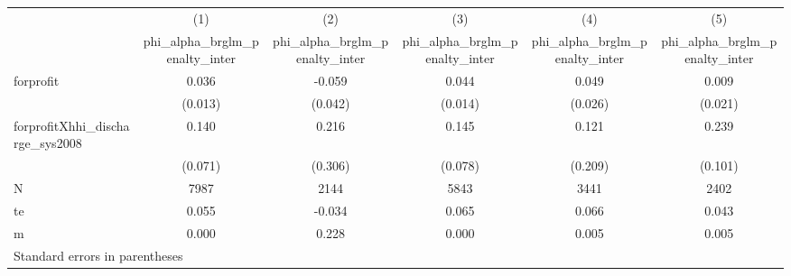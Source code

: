 \begin{tabular}{l*{5}{c}}
\hline\hline
            &\multicolumn{1}{c}{(1)}&\multicolumn{1}{c}{(2)}&\multicolumn{1}{c}{(3)}&\multicolumn{1}{c}{(4)}&\multicolumn{1}{c}{(5)}\\
            &\multicolumn{1}{c}{phi\_alpha\_brglm\_penalty\_inter}&\multicolumn{1}{c}{phi\_alpha\_brglm\_penalty\_inter}&\multicolumn{1}{c}{phi\_alpha\_brglm\_penalty\_inter}&\multicolumn{1}{c}{phi\_alpha\_brglm\_penalty\_inter}&\multicolumn{1}{c}{phi\_alpha\_brglm\_penalty\_inter}\\
\hline
forprofit   &       0.036&      -0.059&       0.044&       0.049&       0.009\\
            &     (0.013)&     (0.042)&     (0.014)&     (0.026)&     (0.021)\\
[1em]
forprofitXhhi\_discharge\_sys2008&       0.140&       0.216&       0.145&       0.121&       0.239\\
            &     (0.071)&     (0.306)&     (0.078)&     (0.209)&     (0.101)\\
\hline
N           &        7987&        2144&        5843&        3441&        2402\\
te          &       0.055&      -0.034&       0.065&       0.066&       0.043\\
m           &       0.000&       0.228&       0.000&       0.005&       0.005\\
\hline\hline
\multicolumn{6}{l}{\footnotesize Standard errors in parentheses}\\
\end{tabular}

